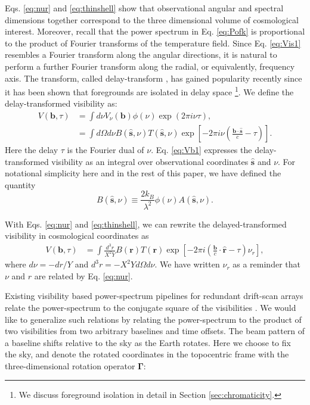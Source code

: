 \documentclass[twocolumn,apj,numberedappendix]{emulateapj}
\renewcommand\[{\begin{equation}}
\renewcommand\]{\end{equation}}
\begin{document}
 
Eqs. \eqref{eq:nur} and \eqref{eq:thinshell} show that observational angular and spectral dimensions together correspond to the three dimensional volume of cosmological interest. Moreover, recall that the power spectrum in Eq. \eqref{eq:Pofk} is proportional to the product of Fourier transforms of the temperature field. Since Eq. \eqref{eq:Vis1} resembles a Fourier transform along the angular directions, it is natural to perform a further Fourier transform along the radial, or equivalently, frequency axis. The transform, called delay-transform \citep{delay-transform}, has gained popularity recently since it has been shown that foregrounds are isolated in delay space \footnote{We discuss foreground isolation in detail in Section \ref{sec:chromaticity}.}. We define the delay-transformed visibility as:
\small
\begin{equation}
\begin{aligned}V(\boldsymbol{b},\tau) & =\int d\nu V_{\nu}(\boldsymbol{b})\phi(\nu)\exp\left(2\pi i\nu\tau\right),\\
 & =\int d\Omega d\nu B(\hat{\boldsymbol{s}},\nu)T(\hat{\boldsymbol{s}},\nu)\exp\left[-2\pi i\nu\left(\frac{\boldsymbol{b}\cdot\hat{\boldsymbol{s}}}{c}-\tau\right)\right]. 
\end{aligned}
\label{eq:Vb1}
\end{equation}
\normalsize
Here the delay $\tau$ is the Fourier dual of $\nu$. Eq. \eqref{eq:Vb1} expresses the delay-transformed visibility as
an integral over observational coordinates $\hat{\boldsymbol{s}}$ and $\nu$. For notational simplicity here and in the rest of this paper, we have defined the quantity
\[
B(\hat{\boldsymbol{s}},\nu) \equiv \frac{2k_B}{\lambda^2}\phi(\nu)A(\hat{\boldsymbol{s}},\nu). 
\label{eq:B}
\]



With Eqs. \eqref{eq:nur} and \eqref{eq:thinshell}, we can rewrite the delayed-transformed visibility in cosmological coordinates as 
\small
\[
\begin{aligned}V(\boldsymbol{b},\tau) & =\int\frac{d^{3}r}{X^{2}Y}B(\boldsymbol{r})T(\boldsymbol{r})\exp\left[-2\pi i\left(\frac{\boldsymbol{b}}{c}\cdot\hat{\boldsymbol{r}}-\tau\right)\nu_{r}\right],
\end{aligned}
\]
\normalsize
where $d\nu=-dr/Y$ and $d^{3}r=-X^{2}Yd\Omega d\nu$. 
We have written $\nu_{r}$ as a reminder that $\nu$ and $r$ are related
by Eq. \eqref{eq:nur}. 

Existing visibility based power-spectrum pipelines for redundant drift-scan  arrays relate the power-spectrum to the conjugate square of the visibilities \citep{delay-transform, paper32, Ali2015}. We would like to generalize such relations by relating the power-spectrum to the product of two visibilities from two arbitrary baselines and time offsets. 
The beam pattern of a baseline shifts relative to the sky as the Earth rotates. Here we choose to fix the sky, and denote the rotated coordinates
in the topocentric frame with the three-dimensional rotation operator $\boldsymbol{\Gamma}$:
\end{document}
